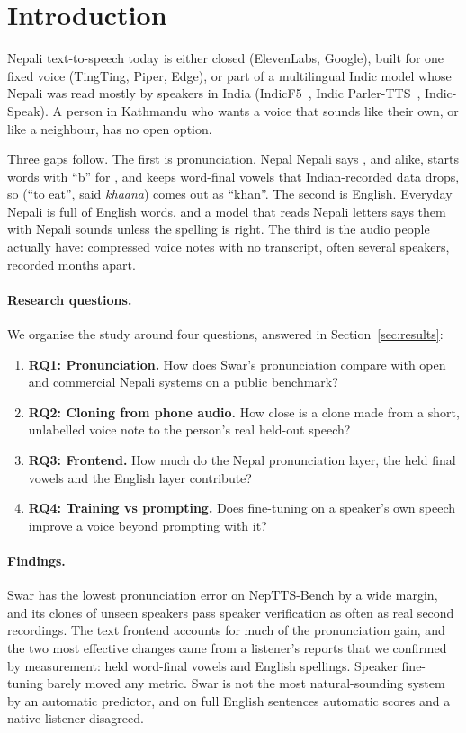 \section{Introduction}

Nepali text-to-speech today is either closed (ElevenLabs, Google), built for one fixed voice (TingTing, Piper, Edge), or part of a multilingual Indic model whose Nepali was read mostly by speakers in India (IndicF5~\citep{indicf5}, Indic Parler-TTS~\citep{parler,indicparler}, Indic-Speak). A person in Kathmandu who wants a voice that sounds like their own, or like a neighbour, has no open option.

Three gaps follow. The first is pronunciation. Nepal Nepali says ,  and  alike, starts words with ``b'' for , and keeps word-final vowels that Indian-recorded data drops, so  (``to eat'', said \emph{khaana}) comes out as ``khan''. The second is English. Everyday Nepali is full of English words, and a model that reads Nepali letters says them with Nepali sounds unless the spelling is right. The third is the audio people actually have: compressed voice notes with no transcript, often several speakers, recorded months apart.

\paragraph{Research questions.} We organise the study around four questions, answered in Section~\ref{sec:results}:
\begin{enumerate}
  \setlength\itemsep{0pt}
  \item \textbf{RQ1: Pronunciation.} How does Swar's pronunciation compare with open and commercial Nepali systems on a public benchmark?
  \item \textbf{RQ2: Cloning from phone audio.} How close is a clone made from a short, unlabelled voice note to the person's real held-out speech?
  \item \textbf{RQ3: Frontend.} How much do the Nepal pronunciation layer, the held final vowels and the English layer contribute?
  \item \textbf{RQ4: Training vs prompting.} Does fine-tuning on a speaker's own speech improve a voice beyond prompting with it?
\end{enumerate}

\paragraph{Findings.} Swar has the lowest pronunciation error on NepTTS-Bench by a wide margin, and its clones of unseen speakers pass speaker verification as often as real second recordings. The text frontend accounts for much of the pronunciation gain, and the two most effective changes came from a listener's reports that we confirmed by measurement: held word-final vowels and English spellings. Speaker fine-tuning barely moved any metric. Swar is not the most natural-sounding system by an automatic predictor, and on full English sentences automatic scores and a native listener disagreed.

